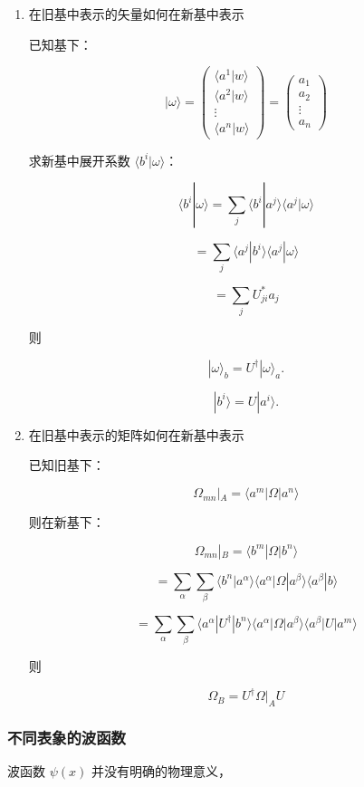 \documentclass[lang=cn,10pt]{elegantbook}
\begin{document}
\begin{enumerate}
	\item 在旧基中表示的矢量如何在新基中表示
	
	已知基下： 
	
	\[
	| \omega \rangle = \begin{pmatrix} \langle a^{1} | w \rangle \\ \langle a^{2} | w \rangle \\ \vdots \\ \langle a^{n} | w \rangle \end{pmatrix} = \begin{pmatrix} a_1 \\ a_2 \\ \vdots \\ a_n \end{pmatrix}
	\]
	
	求新基中展开系数 $\langle b^{i} | \omega \rangle$：
	
	\[
	\langle b^{i} | \omega \rangle = \sum_j \langle b^{i} | a^{j} \rangle \langle a^{j} | \omega \rangle
	\]
	
	\[
	= \sum_j \langle a^{j} | b^{i} \rangle \langle a^{j} | \omega \rangle
	\]
	
	\[
	= \sum_j U_{ji}^* a_j
	\]
	

	
	则 
	
	\[
	|  \omega \rangle_b = U^{\dagger} | \omega \rangle_a.
	\]
	
		\[
	|  b^i \rangle = U | a^i \rangle.
	\]
	
	\item 在旧基中表示的矩阵如何在新基中表示
	
	已知旧基下：
	
	\[
	\Omega_{mn} | _A  = \langle a^{m} | \Omega | a^{n} \rangle
	\]
	
	则在新基下：
	
	\[
	\Omega_{mn} |_B = \langle b^{m} | \Omega | b^{n} \rangle
	\]
	
	\[
	= \sum_{\alpha} \sum_{\beta} \langle b^{n} | a^{\alpha} \rangle \langle a^{\alpha} | \Omega | a^{\beta} \rangle \langle a^{\beta} | b \rangle
	\]
	
	\[
	= \sum_{\alpha} \sum_{\beta} \langle a^{\alpha} | U^{\dagger} | b^{n} \rangle \langle a^{\alpha} | \Omega | a^{\beta} \rangle \langle a^{\beta} | U | a^{m} \rangle
	\]
	
	则 
	
	\[
	 \Omega _B = U^{\dagger} \Omega|_A U
	\]
\end{enumerate}
\subsubsection{不同表象的波函数}
波函数 $\psi(x)$ 并没有明确的物理意义， 
\end{document}
